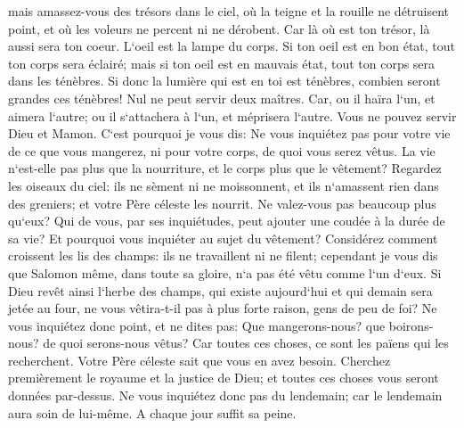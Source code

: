 \verse mais amassez-vous des trésors dans le ciel, où la teigne et la rouille ne détruisent point, et où les voleurs ne percent ni ne dérobent. 
\verse Car là où est ton trésor, là aussi sera ton coeur. 
\verse L`oeil est la lampe du corps. Si ton oeil est en bon état, tout ton corps sera éclairé; 
\verse mais si ton oeil est en mauvais état, tout ton corps sera dans les ténèbres. Si donc la lumière qui est en toi est ténèbres, combien seront grandes ces ténèbres! 
\verse Nul ne peut servir deux maîtres. Car, ou il haïra l`un, et aimera l`autre; ou il s`attachera à l`un, et méprisera l`autre. Vous ne pouvez servir Dieu et Mamon. 
\verse C`est pourquoi je vous dis: Ne vous inquiétez pas pour votre vie de ce que vous mangerez, ni pour votre corps, de quoi vous serez vêtus. La vie n`est-elle pas plus que la nourriture, et le corps plus que le vêtement? 
\verse Regardez les oiseaux du ciel: ils ne sèment ni ne moissonnent, et ils n`amassent rien dans des greniers; et votre Père céleste les nourrit. Ne valez-vous pas beaucoup plus qu`eux? 
\verse Qui de vous, par ses inquiétudes, peut ajouter une coudée à la durée de sa vie? 
\verse Et pourquoi vous inquiéter au sujet du vêtement? Considérez comment croissent les lis des champs: ils ne travaillent ni ne filent; 
\verse cependant je vous dis que Salomon même, dans toute sa gloire, n`a pas été vêtu comme l`un d`eux. 
\verse Si Dieu revêt ainsi l`herbe des champs, qui existe aujourd`hui et qui demain sera jetée au four, ne vous vêtira-t-il pas à plus forte raison, gens de peu de foi? 
\verse Ne vous inquiétez donc point, et ne dites pas: Que mangerons-nous? que boirons-nous? de quoi serons-nous vêtus? 
\verse Car toutes ces choses, ce sont les païens qui les recherchent. Votre Père céleste sait que vous en avez besoin. 
\verse Cherchez premièrement le royaume et la justice de Dieu; et toutes ces choses vous seront données par-dessus. 
\verse Ne vous inquiétez donc pas du lendemain; car le lendemain aura soin de lui-même. A chaque jour suffit sa peine. 


